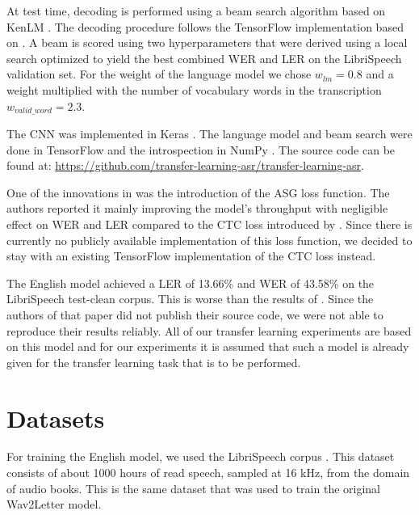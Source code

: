 \documentclass[11pt,a4paper]{article}
\newcommand{\anonymize}[2]{\textcolor{black}{#1}}		%
\begin{document}
At test time, decoding is performed using a beam search algorithm based on KenLM \cite{Heafield-estimate}.
The decoding procedure follows the TensorFlow implementation based on \cite{DBLP:series/sci/2012-385}.
A beam is scored using two hyperparameters that were derived using a local search optimized to yield the best combined \ac{WER} and \ac{LER} on the LibriSpeech \cite{panayotov_librispeech_2015} validation set.
For the weight of the language model we chose $w_{lm} = 0.8$ and a weight multiplied with the number of vocabulary words in the transcription $w_{valid\_word} = 2.3$.

The \ac{CNN} was implemented in Keras \cite{chollet2015keras}.
The language model and beam search were done in TensorFlow \cite{tensorflow2015-whitepaper} and the introspection in NumPy \cite{DBLP:journals/corr/abs-1102-1523}.
The source code can be found at:
\anonymize{
\href{https://github.com/transfer-learning-asr/transfer-learning-asr}{https://github.com/transfer-learning-asr/transfer-learning-asr}.
}{
Omitted for double-blind review.
}

One of the innovations in \citet{collobert_wav2letter_2016} was the introduction of the \ac{ASG} loss function.
The authors reported it mainly improving the model's throughput with negligible effect on \ac{WER} and \ac{LER} compared to the \ac{CTC} loss introduced by \citet{graves2006connectionist}.
Since there is currently no publicly available implementation of this loss function, we decided to stay with an existing TensorFlow implementation of the \ac{CTC} loss instead.

The English model achieved a \ac{LER} of 13.66\% and \ac{WER} of 43.58\% on the LibriSpeech \cite{panayotov_librispeech_2015} test-clean corpus.
This is worse than the results of \citet{collobert_wav2letter_2016}.
Since the authors of that paper did not publish their source code, we were not able to reproduce their results reliably.
All of our transfer learning experiments are based on this model and for our experiments it is assumed that such a model is already given for the transfer learning task that is to be performed.


\section{Datasets}\label{sec:datasets}

For training the English model, we used the LibriSpeech corpus \cite{panayotov_librispeech_2015}. 
This dataset consists of about 1000 hours of read speech, sampled at 16 kHz, from the domain of audio books. 
This is the same dataset that was used to train the original Wav2Letter model.
\end{document}
